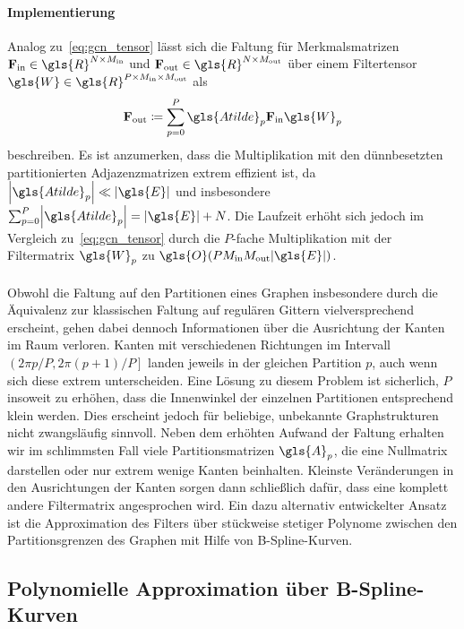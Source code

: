 \paragraph{Implementierung}
\label{partitionierung_implementierung}

Analog zu~\eqref{eq:gcn_tensor} lässt sich die Faltung für Merkmalsmatrizen $\ma{F}_{\mathrm{in}} \in \gls{R}^{N \times M_{\mathrm{in}}}$ und $\ma{F}_{\mathrm{out}} \in \gls{R}^{N \times M_{\mathrm{out}}}$ über einem Filtertensor $\gls{W} \in \gls{R}^{P \times M_{\mathrm{in}} \times M_{\mathrm{out}}}$ als
\begin{equation*}
  \ma{F}_{\mathrm{out}} \coloneqq \sum_{p=0}^P \gls{Atilde}_p\ma{F}_{\mathrm{in}}\gls{W}_p
\end{equation*}
beschreiben.
Es ist anzumerken, dass die Multiplikation mit den dünnbesetzten partitionierten Adjazenzmatrizen extrem effizient ist, da $\left|\gls{Atilde}_p\right| \ll \left|\gls{E}\right|$ und insbesondere $\sum_{p=0}^P \left|\gls{Atilde}_p\right| = \left|\gls{E}\right| + N$.
Die Laufzeit erhöht sich jedoch im Vergleich zu~\eqref{eq:gcn_tensor} durch die $P$-fache Multiplikation mit der Filtermatrix $\gls{W}_p$ zu $\gls{O}\left(PM_{\mathrm{in}}M_{\mathrm{out}}\left|\gls{E}\right|\right)$.
\\\\
Obwohl die Faltung auf den Partitionen eines Graphen insbesondere durch die Äquivalenz zur klassischen Faltung auf regulären Gittern vielversprechend erscheint, gehen dabei dennoch Informationen über die Ausrichtung der Kanten im Raum verloren.
Kanten mit verschiedenen Richtungen im Intervall $\left(2\pi p/P, 2\pi \left(p+1\right)/P\right]$ landen jeweils in der gleichen Partition $p$, auch wenn sich diese \evtl{} extrem unterscheiden.
Eine Lösung zu diesem Problem ist sicherlich, $P$ insoweit zu erhöhen, dass die Innenwinkel der einzelnen Partitionen entsprechend klein werden.
Dies erscheint jedoch für beliebige, unbekannte Graphstrukturen nicht zwangsläufig sinnvoll.
Neben dem erhöhten Aufwand der Faltung erhalten wir im schlimmsten Fall viele Partitionsmatrizen $\gls{A}_p$, die eine Nullmatrix  darstellen oder nur extrem wenige Kanten beinhalten.
Kleinste Veränderungen in den Ausrichtungen der Kanten sorgen dann schließlich dafür, dass eine komplett andere Filtermatrix angesprochen wird.
Ein dazu alternativ entwickelter Ansatz ist die Approximation des Filters über stückweise stetiger Polynome zwischen den Partitionsgrenzen des Graphen mit Hilfe von B-Spline-Kurven.

\subsection{Polynomielle Approximation über B-Spline-Kurven}
\label{bspline}

